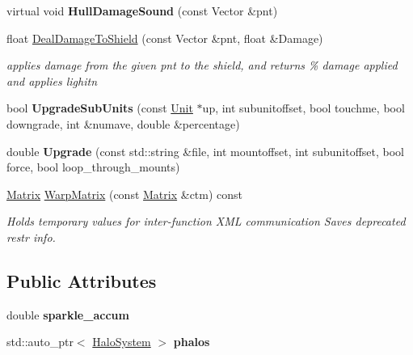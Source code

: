 \begin{DoxyCompactItemize}
\item 
virtual void {\bfseries Hull\+Damage\+Sound} (const Vector \&pnt)\hypertarget{classGameUnit_a054312c6b9f9056634c1872fc4816f3f}{}\label{classGameUnit_a054312c6b9f9056634c1872fc4816f3f}

\item 
float \hyperlink{classGameUnit_aa6d15ec47e4141670f2a70475c5ff496}{Deal\+Damage\+To\+Shield} (const Vector \&pnt, float \&Damage)\hypertarget{classGameUnit_aa6d15ec47e4141670f2a70475c5ff496}{}\label{classGameUnit_aa6d15ec47e4141670f2a70475c5ff496}

\begin{DoxyCompactList}\small\item\em applies damage from the given pnt to the shield, and returns \% damage applied and applies lighitn \end{DoxyCompactList}\item 
bool {\bfseries Upgrade\+Sub\+Units} (const \hyperlink{classUnit}{Unit} $\ast$up, int subunitoffset, bool touchme, bool downgrade, int \&numave, double \&percentage)\hypertarget{classGameUnit_a3d1173ec336a4744643d69305f0236fc}{}\label{classGameUnit_a3d1173ec336a4744643d69305f0236fc}

\item 
double {\bfseries Upgrade} (const std\+::string \&file, int mountoffset, int subunitoffset, bool force, bool loop\+\_\+through\+\_\+mounts)\hypertarget{classGameUnit_ab4c5ed89df4936dea673718a31039ce1}{}\label{classGameUnit_ab4c5ed89df4936dea673718a31039ce1}

\item 
\hyperlink{classMatrix}{Matrix} \hyperlink{classGameUnit_a3628587fb593c58ad5179801c35bf63b}{Warp\+Matrix} (const \hyperlink{classMatrix}{Matrix} \&ctm) const \hypertarget{classGameUnit_a3628587fb593c58ad5179801c35bf63b}{}\label{classGameUnit_a3628587fb593c58ad5179801c35bf63b}

\begin{DoxyCompactList}\small\item\em Holds temporary values for inter-\/function X\+ML communication Saves deprecated restr info. \end{DoxyCompactList}\end{DoxyCompactItemize}
\subsection*{Public Attributes}
\begin{DoxyCompactItemize}
\item 
double {\bfseries sparkle\+\_\+accum}\hypertarget{classGameUnit_a39a31c3ecb63c6bacb97d860119b8933}{}\label{classGameUnit_a39a31c3ecb63c6bacb97d860119b8933}

\item 
std\+::auto\+\_\+ptr$<$ \hyperlink{classHaloSystem}{Halo\+System} $>$ {\bfseries phalos}\hypertarget{classGameUnit_a9c4ecfc212b033d0a24d459bb21d98b5}{}\label{classGameUnit_a9c4ecfc212b033d0a24d459bb21d98b5}

\end{DoxyCompactItemize}

